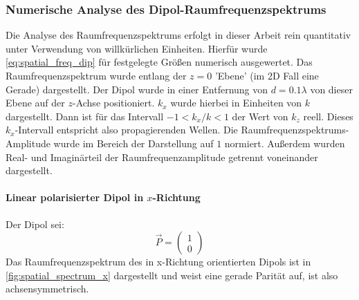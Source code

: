 \documentclass[a4paper, titlepage,  ngerman]{book}
\begin{document}
	\subsubsection{Numerische Analyse des Dipol-Raumfrequenzspektrums}
	Die Analyse des Raumfrequenzspektrums erfolgt in dieser Arbeit rein quantitativ unter Verwendung von willkürlichen Einheiten. Hierfür wurde \eqref{eq:spatial_freq_dip} für festgelegte Größen numerisch ausgewertet.
	Das Raumfrequenzspektrum wurde entlang der $z = 0$ 'Ebene' (im 2D Fall eine Gerade) dargestellt. Der Dipol wurde in einer Entfernung von $d = 0.1 \lambda$  von dieser Ebene auf der $z$-Achse positioniert. $k_x$ wurde hierbei in Einheiten von $k$ dargestellt. Dann ist für das Intervall $-1 < k_x / k <1$ der Wert von $k_z$ reell. Dieses $k_x$-Intervall entspricht also propagierenden Wellen. Die Raumfrequenzspektrums-Amplitude wurde im Bereich der Darstellung auf $1$ normiert. Außerdem wurden Real- und Imaginärteil der Raumfrequenzamplitude getrennt voneinander dargestellt.
	\paragraph{Linear polarisierter Dipol in $x$-Richtung}
	Der Dipol sei:
	$$\vec{P} = \begin{pmatrix} 1 \\ 0\end{pmatrix}$$
	Das Raumfrequenzspektrum des in x-Richtung orientierten Dipols ist in \ref{fig:spatial_spectrum_x} dargestellt und weist eine gerade Parität auf, ist also achsensymmetrisch.	
\end{document}
